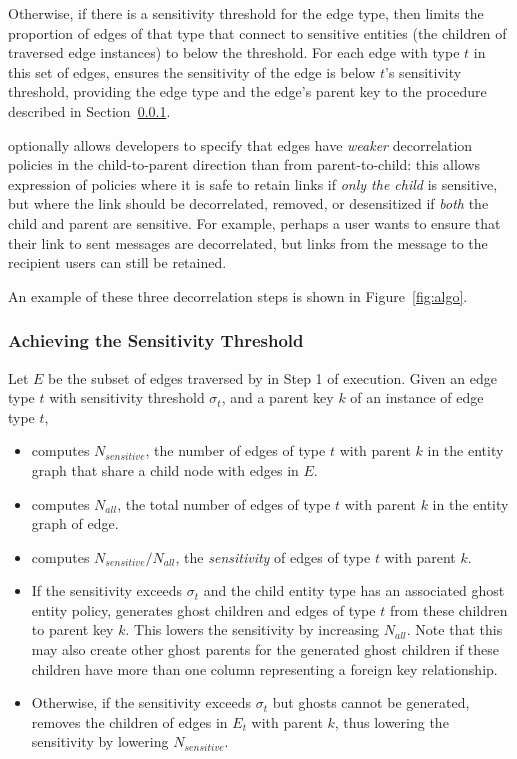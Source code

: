 \begin{enumerate}
        Otherwise, if there is a sensitivity threshold for the edge type, then \sys limits the
        proportion of edges of that type that connect to sensitive entities (the children of
        traversed edge instances) to below the threshold. 
        For each edge with type $t$ in this set of edges, \sys ensures the
        sensitivity of the edge is below $t$'s sensitivity threshold, providing the edge type and the edge's
        parent key to the procedure described in Section~\ref{sensitivity_algo}. 

        \sys optionally allows developers to specify that edges have \emph{weaker}
        decorrelation policies in the child-to-parent direction than from parent-to-child: this
        allows expression of policies where it is safe to retain links if \emph{only the child} is
        sensitive, but where the link should be decorrelated, removed, or desensitized if
        \emph{both} the child
        and parent are sensitive. For example, perhaps a user wants to ensure that their link to
        sent messages are decorrelated, but links from the message to the recipient users 
        can still be retained.
\end{enumerate}

An example of these three decorrelation steps is shown in Figure~\ref{fig:algo}.

\subsubsection{Achieving the Sensitivity Threshold}
\label{sensitivity_algo}
Let $E$ be the subset of edges traversed by \sys in Step 1 of execution. 
Given an edge type $t$ with sensitivity threshold $\sigma_t$, and a parent key $k$ of an instance of
edge type $t$, 
    \begin{itemize}
        \item \sys computes $N_{sensitive}$, the number of edges of type $t$ with parent $k$ in the entity graph that share 
            a child node with edges in $E$.
        \item \sys computes $N_{all}$, the total number of edges of type $t$ with parent $k$
            in the entity graph of edge.
        \item \sys computes $N_{sensitive}/N_{all}$, the \emph{sensitivity} of edges of type $t$
            with parent $k$.
        \item If the sensitivity exceeds $\sigma_t$ and the child entity type has an associated ghost entity policy, \sys
            generates ghost children and edges of type $t$ from these children to parent
            key $k$. This lowers the sensitivity by increasing $N_{all}$. Note that this may also
            create other ghost parents for the generated ghost children if these children have more
            than one column representing a foreign key relationship.
        \item Otherwise, if the sensitivity exceeds $\sigma_t$ but ghosts cannot be generated,
            \sys removes the children of edges in $E_t$ with parent $k$, thus lowering the
            sensitivity by lowering $N_{sensitive}$.
    \end{itemize}

